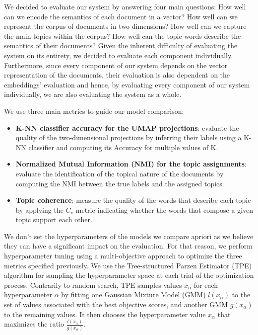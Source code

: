 \documentclass[a4paper]{article}
\begin{document}
We decided to evaluate our system by answering four main questions: How well can we encode the semantics of each document in a vector? How well can we represent the corpus of documents in two dimensions? How well can we capture the main topics within the corpus? How well can the topic words describe the semantics of their documents?
Given the inherent difficulty of evaluating the system on its entirety, we decided to evaluate each component individually. Furthermore, since every component of our system depends on the vector representation of the documents, their evaluation is also dependent on the embeddings' evaluation and hence, by evaluating every component of our system individually, we are also evaluating the system as a whole.

We use three main metrics to guide our model comparison: 
\begin{itemize}
  \item \textbf{K-NN classifier accuracy for the UMAP projections}: evaluate the quality of the two-dimensional projections by inferring their labels using a K-NN classifier and computing its Accuracy for multiple values of K.
  \item \textbf{Normalized Mutual Information (NMI) for the topic assignments}: evaluate the identification of the topical nature of the documents by computing the NMI between the true labels and the assigned topics.
  \item \textbf{Topic coherence}: measure the quality of the words that describe each topic by applying the $C_v$ metric \citep{roder2015} indicating whether the words that compose a given topic support each other.
\end{itemize}

We don't set the hyperparameters of the models we compare apriori as we believe they can have a significant impact on the evaluation. For that reason, we perform hyperparameter tuning using a multi-objective approach to optimize the three metrics specified previously. We use the Tree-structured Parzen Estimator (TPE) algorithm \citep{bergstra2011, ozaki2020} for sampling the hyperparameter space at each trial of the optimization process. Contrarily to random search, TPE samples values $x_\alpha$ for each hyperparameter $\alpha$ by fitting one Gaussian Mixture Model (GMM) $l(x_\alpha)$ to the set of values associated with the best objective scores, and another GMM $g(x_\alpha)$ to the remaining values. It then chooses the hyperparameter value $x_\alpha$ that maximizes the ratio $\frac{l(x_\alpha)}{g(x_\alpha)}$.
\end{document}
